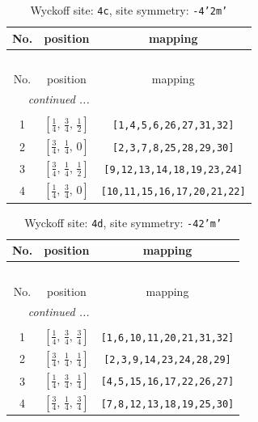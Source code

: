 \documentclass[fleqn,8pt]{jsarticle}
\begin{document}
\renewcommand{\arraystretch}{1.2}
\begin{longtable}{ccc}
\caption{Wyckoff site: {\tt 4c}, site symmetry: {\tt -4'2m'}}
 \\
 \hline \hline
No. & position & mapping \\ \hline \endfirsthead

\multicolumn{2}{l}{\tablename\ \thetable{}} \\
 \hline \hline
No. & position & mapping \\ \hline \endhead

 \hline \hline
\multicolumn{2}{r}{\footnotesize\it continued ...} \\ \endfoot

 \hline \hline
\multicolumn{2}{r}{} \\ \endlastfoot

1 & $\left[ \frac{1}{4},\, \frac{3}{4},\, \frac{1}{2} \right]$ & {\tt [1,4,5,6,26,27,31,32]} \\ \hline
2 & $\left[ \frac{3}{4},\, \frac{1}{4},\, 0 \right]$ & {\tt [2,3,7,8,25,28,29,30]} \\ \hline
3 & $\left[ \frac{3}{4},\, \frac{1}{4},\, \frac{1}{2} \right]$ & {\tt [9,12,13,14,18,19,23,24]} \\ \hline
4 & $\left[ \frac{1}{4},\, \frac{3}{4},\, 0 \right]$ & {\tt [10,11,15,16,17,20,21,22]} \\
\end{longtable}
\renewcommand{\arraystretch}{1.2}
\begin{longtable}{ccc}
\caption{Wyckoff site: {\tt 4d}, site symmetry: {\tt -42'm'}}
 \\
 \hline \hline
No. & position & mapping \\ \hline \endfirsthead

\multicolumn{2}{l}{\tablename\ \thetable{}} \\
 \hline \hline
No. & position & mapping \\ \hline \endhead

 \hline \hline
\multicolumn{2}{r}{\footnotesize\it continued ...} \\ \endfoot

 \hline \hline
\multicolumn{2}{r}{} \\ \endlastfoot

1 & $\left[ \frac{1}{4},\, \frac{3}{4},\, \frac{3}{4} \right]$ & {\tt [1,6,10,11,20,21,31,32]} \\ \hline
2 & $\left[ \frac{3}{4},\, \frac{1}{4},\, \frac{1}{4} \right]$ & {\tt [2,3,9,14,23,24,28,29]} \\ \hline
3 & $\left[ \frac{1}{4},\, \frac{3}{4},\, \frac{1}{4} \right]$ & {\tt [4,5,15,16,17,22,26,27]} \\ \hline
4 & $\left[ \frac{3}{4},\, \frac{1}{4},\, \frac{3}{4} \right]$ & {\tt [7,8,12,13,18,19,25,30]} \\
\end{longtable}
\end{document}
